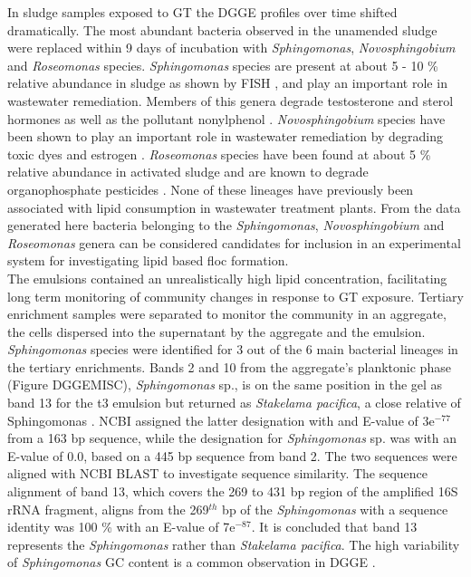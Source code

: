 \documentclass[twoside]{article}
\begin{document}
In sludge samples exposed to GT the DGGE profiles over time shifted dramatically. The most abundant bacteria observed in the unamended sludge were replaced within 9 days of incubation with \emph{Sphingomonas}, \emph{Novosphingobium} and \emph{Roseomonas} species.
\emph{Sphingomonas} species are present at about 5 - 10 \% relative abundance in sludge as shown by FISH \cite{neef1999detection}, and play an important role in wastewater remediation. Members of this genera degrade testosterone and sterol hormones as well as the pollutant nonylphenol \cite{fujii2001sphingomonas,roh201017beta}. \emph{Novosphingobium} species have been shown to play an important role in wastewater remediation by degrading toxic dyes and estrogen \cite{addison2007novosphingobium,hashimoto2009contribution}.
\emph{Roseomonas} species have been found at about 5 \% relative abundance in activated sludge and are known to degrade organophosphate pesticides \cite{jiang2008bacterial,jiang2006isolation}. None of these lineages have previously been associated with lipid consumption in wastewater treatment plants. From the data generated here bacteria belonging to the \emph{Sphingomonas}, \emph{Novosphingobium} and \emph{Roseomonas} genera can be considered candidates for inclusion in an experimental system for investigating lipid based floc formation. \\


The emulsions contained an unrealistically high lipid concentration, facilitating long term monitoring of community changes in response to GT exposure.
Tertiary enrichment samples were separated to monitor the community in an aggregate, the cells dispersed into the supernatant by the aggregate and the emulsion. \\



\emph{Sphingomonas} species were identified for 3 out of the 6 main bacterial lineages in the tertiary enrichments. Bands 2 and 10 from the aggregate's  planktonic phase (Figure DGGEMISC), \emph{Sphingomonas} sp., is on the same position in the gel as band 13 for the t3 emulsion but returned as \emph{Stakelama pacifica}, a close relative of Sphingomonas \cite{chen2010stakelama}.
NCBI assigned the latter designation with and E-value of 3e$^{-77}$ from a 163 bp sequence, while the designation for \emph{Sphingomonas} sp. was with an E-value of 0.0, based on a 445 bp sequence from band 2. The two sequences were aligned with NCBI BLAST to investigate sequence similarity. The sequence alignment of band 13, which covers the 269 to 431 bp region of the amplified 16S rRNA fragment, aligns from the 269$^{th}$ bp of the \emph{Sphingomonas} with a sequence identity was 100 \% with an E-value of 7e$^{-87}$. It is concluded that band 13 represents the \emph{Sphingomonas} rather than \emph{Stakelama pacifica}.
The high variability of \emph{Sphingomonas} GC content is a common observation in DGGE \cite{qiao2012effect}.\\
\end{document}

